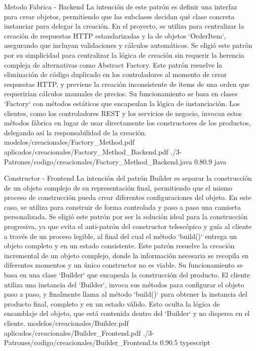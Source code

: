 \Patron
    {Metodo Fabrica - Backend}
    {La intención de este patrón es definir una interfaz para crear objetos, permitiendo que las subclases decidan qué clase concreta instanciar para delegar la creación. En el proyecto, se utiliza para centralizar la creación de respuestas HTTP estandarizadas y la de objetos `OrderItem`, asegurando que incluyan validaciones y cálculos automáticos. Se eligió este patrón por su simplicidad para centralizar la lógica de creación sin requerir la herencia compleja de alternativas como Abstract Factory.}
    {Este patrón resuelve la eliminación de código duplicado en los controladores al momento de crear respuestas HTTP, y previene la creación inconsistente de items de una orden que requerirían cálculos manuales de precios. Su funcionamiento se basa en clases `Factory` con métodos estáticos que encapsulan la lógica de instanciación. Los clientes, como los controladores REST y los servicios de negocio, invocan estos métodos fábrica en lugar de usar directamente los constructores de los productos, delegando así la responsabilidad de la creación.}
    {modelos/creacionales/Factory_Method.pdf}
    {aplicados/creacionales/Factory_Method_Backend.pdf}
    {./3-Patrones/codigo/creacionales/Factory_Method_Backend.java}
    {0.8}{0.9}
    {java}
\newpage

\Patron
    {Constructor - Frontend}
    {La intención del patrón Builder es separar la construcción de un objeto complejo de su representación final, permitiendo que el mismo proceso de construcción pueda crear diferentes configuraciones del objeto. En este caso, se utiliza para construir de forma controlada y paso a paso una camiseta personalizada. Se eligió este patrón por ser la solución ideal para la construcción progresiva, ya que evita el anti-patrón del constructor telescópico y guía al cliente a través de un proceso legible, al final del cual el método `build()` entrega un objeto completo y en un estado consistente.}
    {Este patrón resuelve la creación incremental de un objeto complejo, donde la información necesaria se recopila en diferentes momentos y un único constructor no es viable. Su funcionamiento se basa en una clase `Builder` que encapsula la construcción del producto. El cliente utiliza una instancia del `Builder`, invoca sus métodos para configurar el objeto paso a paso, y finalmente llama al método `build()` para obtener la instancia del producto final, completo y en un estado válido. Esto oculta la lógica de ensamblaje del objeto, que está contenida dentro del `Builder` y no dispersa en el cliente.}
    {modelos/creacionales/Builder.pdf}
    {aplicados/creacionales/Builder_Frontend.pdf}
    {./3-Patrones/codigo/creacionales/Builder_Frontend.ts}
    {0.9}{0.5}
    {typescript}
\newpage

